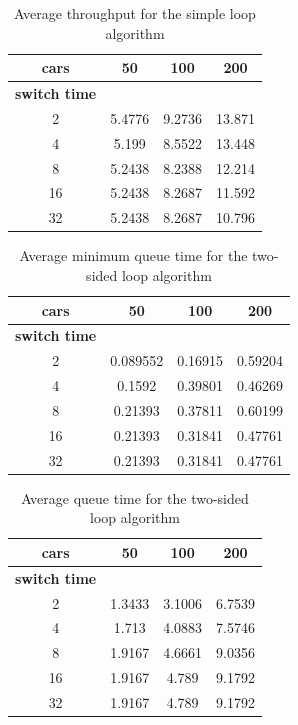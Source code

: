 \documentclass[a4paper,11pt]{article}
\begin{document}
\begin{table}[htb]
\centering
\begin{tabular}{cccc}
\hline
\textbf{cars} & 50 & 100 & 200\\
\hline
\textbf{switch time} & & & \\
2 & 5.4776 & 9.2736 & 13.871 \\
4 & 5.199 & 8.5522 & 13.448 \\
8 & 5.2438 & 8.2388 & 12.214 \\
16 & 5.2438 & 8.2687 & 11.592 \\
32 & 5.2438 & 8.2687 & 10.796 \\
\hline
\end{tabular}
\caption{Average throughput for the simple loop algorithm}
\end{table}


\begin{table}[htb]
\centering
\begin{tabular}{cccc}
\hline
\textbf{cars} & 50 & 100 & 200\\
\hline
\textbf{switch time} & & & \\
2 & 0.089552 & 0.16915 & 0.59204 \\
4 & 0.1592 & 0.39801 & 0.46269 \\
8 & 0.21393 & 0.37811 & 0.60199 \\
16 & 0.21393 & 0.31841 & 0.47761 \\
32 & 0.21393 & 0.31841 & 0.47761 \\
\hline
\end{tabular}
\caption{Average minimum queue time for the two-sided loop algorithm}
\end{table}

\begin{table}[htb]
\centering
\begin{tabular}{cccc}
\hline
\textbf{cars} & 50 & 100 & 200\\
\hline
\textbf{switch time} & & & \\
2 & 1.3433 & 3.1006 & 6.7539 \\
4 & 1.713 & 4.0883 & 7.5746 \\
8 & 1.9167 & 4.6661 & 9.0356 \\
16 & 1.9167 & 4.789 & 9.1792 \\
32 & 1.9167 & 4.789 & 9.1792 \\
\hline
\end{tabular}
\caption{Average queue time for the two-sided loop algorithm}
\end{table}
\end{document}
